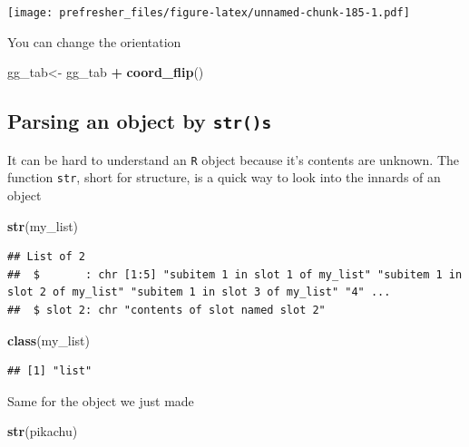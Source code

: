 \documentclass[
]{book}
\newenvironment{Shaded}{\begin{snugshade}}{\end{snugshade}}
\newcommand{\KeywordTok}[1]{\textcolor[rgb]{0.13,0.29,0.53}{\textbf{#1}}}
\newcommand{\NormalTok}[1]{#1}
\newcommand{\OperatorTok}[1]{\textcolor[rgb]{0.81,0.36,0.00}{\textbf{#1}}}
\newcommand{\StringTok}[1]{\textcolor[rgb]{0.31,0.60,0.02}{#1}}
\theoremstyle{definition}
\theoremstyle{definition}
\theoremstyle{definition}
\theoremstyle{remark}
\begin{document}
\texttt{[image: prefresher\_files/figure-latex/unnamed-chunk-185-1.pdf]}

You can change the orientation

\begin{Shaded}
\begin{Highlighting}[]
\NormalTok{gg\_tab<{-}}\StringTok{ }\NormalTok{gg\_tab }\OperatorTok{+}\StringTok{ }\KeywordTok{coord\_flip}\NormalTok{()}
\end{Highlighting}
\end{Shaded}

\hypertarget{parsing-an-object-by-strs}{%
\subsection{\texorpdfstring{Parsing an object by \texttt{str()s}}{Parsing an object by str()s}}\label{parsing-an-object-by-strs}}

It can be hard to understand an \texttt{R} object because it's contents are unknown. The function \texttt{str}, short for structure, is a quick way to look into the innards of an object

\begin{Shaded}
\begin{Highlighting}[]
\KeywordTok{str}\NormalTok{(my\_list)}
\end{Highlighting}
\end{Shaded}

\begin{verbatim}
## List of 2
##  $       : chr [1:5] "subitem 1 in slot 1 of my_list" "subitem 1 in slot 2 of my_list" "subitem 1 in slot 3 of my_list" "4" ...
##  $ slot 2: chr "contents of slot named slot 2"
\end{verbatim}

\begin{Shaded}
\begin{Highlighting}[]
\KeywordTok{class}\NormalTok{(my\_list)}
\end{Highlighting}
\end{Shaded}

\begin{verbatim}
## [1] "list"
\end{verbatim}

Same for the object we just made

\begin{Shaded}
\begin{Highlighting}[]
\KeywordTok{str}\NormalTok{(pikachu)}
\end{Highlighting}
\end{Shaded}
\end{document}
